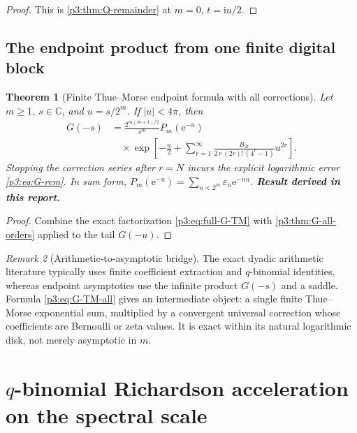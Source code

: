 \documentclass[11pt,oneside]{article}
\numberwithin{equation}{section}
\newtheorem{theorem}{Theorem}[section]
\theoremstyle{definition}
\theoremstyle{remark}
\newtheorem{remark}[theorem]{Remark}
\newcommand{\C}{\mathbb C}
\newcommand{\e}{\mathrm e}
\newcommand{\ii}{\mathrm i}
\newcommand{\eps}{\varepsilon}
\newcommand{\newresult}{\textbf{Result derived in this report.}}
\begin{document}
\begin{proof}
This is \cref{p3:thm:Q-remainder} at $m=0$, $t=\ii u/2$.
\end{proof}

\subsection{The endpoint product from one finite digital block}

\begin{theorem}[Finite Thue--Morse endpoint formula with all corrections]
\label{p3:thm:G-TM-all}
Let $m\ge1$, $s\in\C$, and $u=s/2^m$.  If $|u|<4\pi$, then
\begin{equation}
 \boxed{
 \begin{aligned}
 G(-s)
 &=\frac{2^{m(m+1)/2}}{s^m}P_m(\e^{-u})\\
 &\quad\times
 \exp\!\left[-\frac{u}{2}
 +\sum_{r=1}^{\infty}
 \frac{B_{2r}}{2\,r\,(2r)!\,(4^r-1)}u^{2r}\right].
 \end{aligned}}
 \label{p3:eq:G-TM-all}
\end{equation}
Stopping the correction series after $r=N$ incurs the explicit logarithmic error
\eqref{p3:eq:G-rem}.  In sum form, $P_m(\e^{-u})=\sum_{n<2^m}\eps_n\e^{-nu}$.
\newresult
\end{theorem}

\begin{proof}
Combine the exact factorization \eqref{p3:eq:full-G-TM} with
\cref{p3:thm:G-all-orders} applied to the tail $G(-u)$.
\end{proof}

\begin{remark}[Arithmetic-to-asymptotic bridge]
The exact dyadic arithmetic literature typically uses finite coefficient extraction and
$q$-binomial identities, whereas endpoint asymptotics use the infinite product $G(-s)$ and a
saddle.  Formula \eqref{p3:eq:G-TM-all} gives an intermediate object: a single finite
Thue--Morse exponential sum, multiplied by a convergent universal correction whose
coefficients are Bernoulli or zeta values.  It is exact within its natural logarithmic disk,
not merely asymptotic in $m$.
\end{remark}

\section{$q$-binomial Richardson acceleration on the spectral scale}
\label{p3:sec:richardson}
\end{document}
